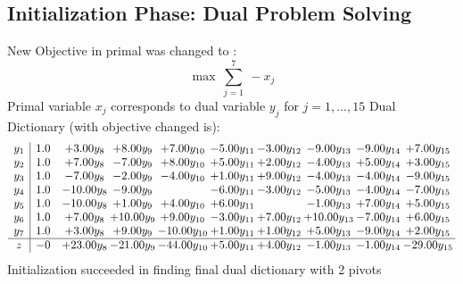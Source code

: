 \documentclass[9pt]{article}
\begin{document}
\subsection{Initialization Phase: Dual Problem Solving}
New Objective in primal was changed to : \[ \max\ \sum_{j=1}^{7}\ - x_j \] 
Primal variable $x_j$ corresponds to dual variable $y_j$ for $j = 1,\ldots,15$
Dual Dictionary (with objective changed is): 
\[\begin{array}{c| c c@{\hskip 2pt} c@{\hskip 2pt} c@{\hskip 2pt} c@{\hskip 2pt} c@{\hskip 2pt} c@{\hskip 2pt} c@{\hskip 2pt} c@{\hskip 2pt} }
 y_{1}   &  1.0 & +  3.00 y_{8} & +  8.00 y_{9} & +  7.00 y_{10} & -5.00 y_{11} & -3.00 y_{12} & -9.00 y_{13} & -9.00 y_{14} & +  7.00 y_{15}\\
 y_{2}   &  1.0 & +  7.00 y_{8} & -7.00 y_{9} & +  8.00 y_{10} & +  5.00 y_{11} & +  2.00 y_{12} & -4.00 y_{13} & +  5.00 y_{14} & +  3.00 y_{15}\\
 y_{3}   &  1.0 & -7.00 y_{8} & -2.00 y_{9} & -4.00 y_{10} & +  1.00 y_{11} & +  9.00 y_{12} & -4.00 y_{13} & -4.00 y_{14} & -9.00 y_{15}\\
 y_{4}   &  1.0 & -10.00 y_{8} & -9.00 y_{9} &   & -6.00 y_{11} & -3.00 y_{12} & -5.00 y_{13} & -4.00 y_{14} & -7.00 y_{15}\\
 y_{5}   &  1.0 & -10.00 y_{8} & +  1.00 y_{9} & +  4.00 y_{10} & +  6.00 y_{11} &   & -1.00 y_{13} & +  7.00 y_{14} & +  5.00 y_{15}\\
 y_{6}   &  1.0 & +  7.00 y_{8} & + 10.00 y_{9} & +  9.00 y_{10} & -3.00 y_{11} & +  7.00 y_{12} & + 10.00 y_{13} & -7.00 y_{14} & +  6.00 y_{15}\\
 y_{7}   &  1.0 & +  3.00 y_{8} & +  9.00 y_{9} & -10.00 y_{10} & +  1.00 y_{11} & +  1.00 y_{12} & +  5.00 y_{13} & -9.00 y_{14} & +  2.00 y_{15}\\
\hline
z    &  -0 & + 23.00 y_{8} & -21.00 y_{9} & -44.00 y_{10} & +  5.00 y_{11} & +  4.00 y_{12} & -1.00 y_{13} & -1.00 y_{14} & -29.00 y_{15}\\
\end{array}\]
Initialization succeeded in finding final dual dictionary with 2 pivots
\end{document}
